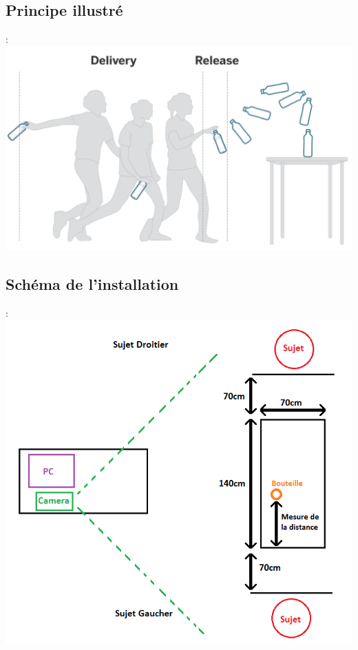 \documentclass[svgnames]{beamer}
\begin{document}
	\subsection{Principe illustré}
	\begin{frame}{\secname : \subsecname}
		\centering
		\includegraphics[scale=0.2]{img/BFC_example.png}
	\end{frame}

	\subsection{Schéma de l'installation}
	\begin{frame}{\secname : \subsecname}
		\centering
		\includegraphics[scale=0.5]{img/BFC_diagram.png}
	\end{frame}
	
\end{document}
